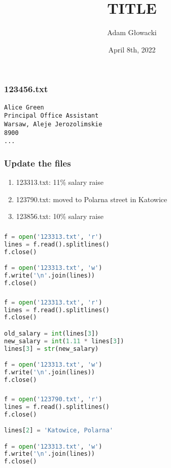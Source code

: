 \documentclass[aspectratio=169]{beamer}
\title{TITLE}
\author{Adam Głowacki}
\date{April 8th, 2022}
\begin{document}
\begin{frame}
\titlepage
\end{frame}

\begin{frame}[fragile]
\frametitle{123456.txt}
\begin{verbatim}
Alice Green
Principal Office Assistant
Warsaw, Aleje Jerozolimskie
8900
...
\end{verbatim}
\end{frame}

\begin{frame}
\frametitle{Update the files}
\begin{enumerate}
  \item 123313.txt: 11\% salary raise
  \item 123790.txt: moved to Polarna street in Katowice
  \item 123856.txt: 10\% salary raise
\end{enumerate}
\end{frame}

\begin{frame}[fragile]
\frametitle{}
\begin{lstlisting}[language=python]
f = open('123313.txt', 'r')
lines = f.read().splitlines()
f.close()

f = open('123313.txt', 'w')
f.write('\n'.join(lines))
f.close()
\end{lstlisting}
\end{frame}

\begin{frame}[fragile]
\frametitle{}
\begin{lstlisting}[language=python]
f = open('123313.txt', 'r')
lines = f.read().splitlines()
f.close()

old_salary = int(lines[3])
new_salary = int(1.11 * lines[3])
lines[3] = str(new_salary)

f = open('123313.txt', 'w')
f.write('\n'.join(lines))
f.close()
\end{lstlisting}
\end{frame}

\begin{frame}[fragile]
\frametitle{}
\begin{lstlisting}[language=python]
f = open('123790.txt', 'r')
lines = f.read().splitlines()
f.close()

lines[2] = 'Katowice, Polarna'

f = open('123313.txt', 'w')
f.write('\n'.join(lines))
f.close()
\end{lstlisting}
\end{frame}
\end{document}
